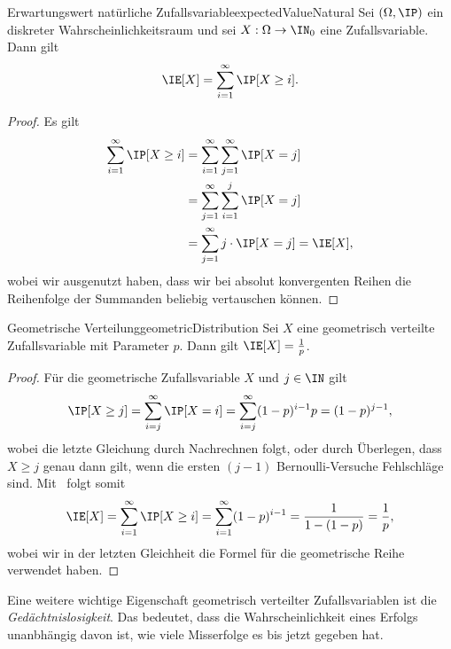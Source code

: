 \documentclass[language=ngerman,algolist]{TemplateLecture}
\begin{document}
\begin{lem}{Erwartungswert natürliche Zufallsvariable}{expectedValueNatural}
    Sei $(\Omega, \IP)$ ein diskreter Wahrscheinlichkeitsraum und sei $X: \Omega \to \IN_0$ eine Zufallsvariable. Dann gilt
    \begin{equation*}
        \IE[X] = \sum_{i=1}^\infty \IP[X \geq i].
    \end{equation*}
\end{lem}
\begin{proof}
    Es gilt 
    \begin{equation*}
        \begin{split}
            \sum_{i=1}^\infty \IP[X \geq i] &= \sum_{i=1}^\infty \sum_{j=1}^\infty \IP[X = j] \\
            &= \sum_{j=1}^\infty \sum_{i=1}^{j} \IP[X = j] \\
            &= \sum_{j = 1}^\infty j \cdot \IP[X = j] = \IE[X],
        \end{split}
    \end{equation*}
    wobei wir ausgenutzt haben, dass wir bei absolut konvergenten Reihen die Reihenfolge der Summanden beliebig vertauschen können.
\end{proof}
\begin{thm}{Geometrische Verteilung}{geometricDistribution}
    Sei $X$ eine geometrisch verteilte Zufallsvariable mit Parameter $p$. Dann gilt $\IE[X] = \frac{1}{p}$.
\end{thm}
\begin{proof}
    Für die geometrische Zufallsvariable $X$ und $j \in \IN$ gilt 
    \begin{equation*}
        \IP[X \geq j] = \sum_{i = j}^\infty \IP[X = i] = \sum_{i = j}^\infty (1-p)^{i-1} p = (1-p)^{j-1},
    \end{equation*}
    wobei die letzte Gleichung durch Nachrechnen folgt, oder durch Überlegen, dass $X \geq j$ genau dann gilt, wenn die ersten $(j-1)$ Bernoulli-Versuche Fehlschläge sind. Mit~ folgt somit
    \begin{equation*}
        \IE[X] = \sum_{i=1}^\infty \IP[X \geq i] = \sum_{i=1}^\infty (1-p)^{i-1} = \frac{1}{1 - (1-p)} = \frac{1}{p},
    \end{equation*}
    wobei wir in der letzten Gleichheit die Formel für die geometrische Reihe verwendet haben.
\end{proof}

Eine weitere wichtige Eigenschaft geometrisch verteilter Zufallsvariablen ist die \emph{Gedächtnislosigkeit}. Das bedeutet, dass die Wahrscheinlichkeit eines Erfolgs unanbhängig davon ist, wie viele Misserfolge es bis jetzt gegeben hat.
\end{document}
